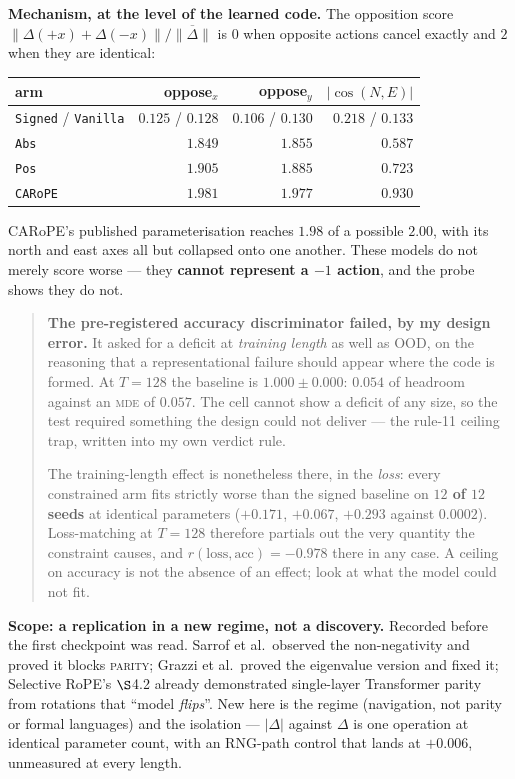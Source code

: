 \documentclass[11pt]{article}
\begin{document}
\textbf{Mechanism, at the level of the learned code.} The opposition score
$\lVert\Delta(+x)+\Delta(-x)\rVert / \overline{\lVert\Delta\rVert}$ is $0$ when
opposite actions cancel exactly and $2$ when they are identical:

\begin{center}\small
\begin{tabular}{lrrr}
\toprule
arm & oppose$_x$ & oppose$_y$ & $|\cos(N,E)|$ \\
\midrule
\texttt{Signed} / \texttt{Vanilla} & $\mathbf{0.125}$ / $0.128$ & $\mathbf{0.106}$ / $0.130$ & $0.218$ / $0.133$ \\
\texttt{Abs}    & $1.849$ & $1.855$ & $0.587$ \\
\texttt{Pos}    & $1.905$ & $1.885$ & $0.723$ \\
\texttt{CARoPE} & $\mathbf{1.981}$ & $\mathbf{1.977}$ & $\mathbf{0.930}$ \\
\bottomrule
\end{tabular}
\end{center}

\noindent CARoPE's published parameterisation reaches $1.98$ of a possible $2.00$,
with its north and east axes all but collapsed onto one another. These models do not
merely score worse --- they \textbf{cannot represent a $-1$ action}, and the probe
shows they do not.

\begin{quote}\small
\textbf{The pre-registered accuracy discriminator failed, by my design error.} It
asked for a deficit at \emph{training length} as well as OOD, on the reasoning that
a representational failure should appear where the code is formed. At $T=128$ the
baseline is $1.000\pm0.000$: $0.054$ of headroom against an \textsc{mde} of $0.057$.
The cell cannot show a deficit of any size, so the test required something the
design could not deliver --- the rule-11 ceiling trap, written into my own verdict
rule.

The training-length effect is nonetheless there, in the \emph{loss}: every
constrained arm fits strictly worse than the signed baseline on \textbf{$12$ of $12$
seeds} at identical parameters ($+0.171$, $+0.067$, $+0.293$ against $0.0002$).
Loss-matching at $T=128$ therefore partials out the very quantity the constraint
causes, and $r(\text{loss},\text{acc}) = -0.978$ there in any case. A ceiling on
accuracy is not the absence of an effect; look at what the model could not fit.
\end{quote}

\noindent\textbf{Scope: a replication in a new regime, not a discovery.} Recorded
before the first checkpoint was read. Sarrof et al.\ observed the non-negativity and
proved it blocks \textsc{parity}; Grazzi et al.\ proved the eigenvalue version and
fixed it; Selective RoPE's $\S$4.2 already demonstrated single-layer Transformer
parity from rotations that ``model \emph{flips}''. New here is the regime
(navigation, not parity or formal languages) and the isolation --- $|\Delta|$
against $\Delta$ is one operation at identical parameter count, with an RNG-path
control that lands at $+0.006$, unmeasured at every length.
\end{document}
